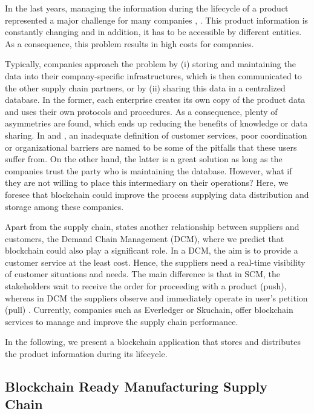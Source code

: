In the last years, managing the information during the lifecycle of a product represented a major challenge for many companies \citep{karkkainen2003product}, \citep{tuttle2002you}. This product information is constantly changing and in addition, it has to be accessible by different entities. As a consequence, this problem results in high costs for companies. 

Typically, companies approach the problem by (i) storing and maintaining the data into their company-specific infrastructures, which is then communicated to the other supply chain partners, or by (ii) sharing this data in a centralized database. In the former, each enterprise creates its own copy of the product data and uses their own protocols and procedures. As a consequence, plenty of asymmetries are found, which ends up reducing the benefits of knowledge or data sharing. In \citep{lee1992managing} and \citep{fiala2005information}, an inadequate definition of customer services, poor coordination or organizational barriers are named to be some of the pitfalls that these users suffer from. On the other hand, the latter is a great solution as long as the companies trust the party who is maintaining the database. However, what if they are not willing to place this intermediary on their operations? Here, we foresee that blockchain could improve the process supplying data distribution and storage among these companies.

Apart from the supply chain, \citep{heikkila2002supply} states another relationship between suppliers and customers, the Demand Chain Management (DCM), where we predict that blockchain could also play a significant role. In a DCM, the aim is to provide a customer service at the least cost. Hence, the suppliers need a real-time visibility of customer situations and needs. The main difference is that in SCM, the stakeholders wait to receive the order for proceeding with a product (push), whereas in DCM the suppliers observe and immediately operate in user's petition (pull) \citep{wust2017you}. Currently, companies such as Everledger or Skuchain, offer blockchain services to manage and improve the supply chain performance.
 
In the following, we present a blockchain application that stores and distributes the product information during its lifecycle.

\subsection{Blockchain Ready Manufacturing Supply Chain} \label{manufacturing}

